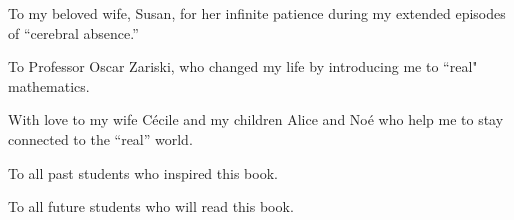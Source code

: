 \documentclass[envcountchap]{svmono}
\begin{document}
\bigskip


\begin{dedication}
To my beloved wife, Susan, for her infinite patience during my extended episodes of ``cerebral absence.''

\smallskip

\noindent
To Professor Oscar Zariski, who changed my life by introducing me to ``real" mathematics.
\medskip

\noindent
With love to my wife C\'ecile and my children Alice and No\'e who help me to stay connected to the ``real'' world.
\smallskip

\noindent To all past students who inspired this book.

\noindent To all future students who will read this book.
\end{dedication}


\tableofcontents





\preface{
}


\mainmatter













\end{document}
